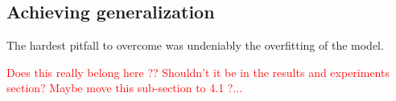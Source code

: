 \subsection{Achieving generalization}

The hardest pitfall to overcome was undeniably the overfitting of the model. 

\textcolor{red}{Does this really belong here ?? Shouldn't it be in the results and
experiments section? Maybe move this sub-section to 4.1 ?...}
